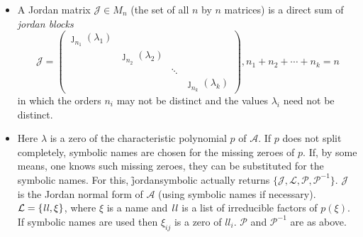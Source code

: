 \begin{description}
\begin{itemize}
\item A Jordan matrix $\mathcal{J} \in M_{n}$ (the set of all $n$ by $n$ 
      matrices) is a direct sum of \emph{jordan blocks}
%
      \begin{displaymath}
      \mathcal{J} = \begin{pmatrix} \jmath_{n_1}(\lambda_{1}) 
      \\  & \jmath_{n_2}(\lambda_{2}) \\ & & \ddots \\ & & & 
      \jmath_{n_k}(\lambda_{k}) \end{pmatrix} ,
      n_{1}+n_{2}+\cdots + n_{k} = n
      \end{displaymath}
%
      in which the orders $n_{i}$ may not be distinct and the 
      values ${\lambda_{i}}$ need not be distinct.

\item Here ${\lambda}$ is a zero of the characteristic polynomial 
      $p$ of $\mathcal{A}$. If $p$ does not split completely, 
      symbolic names are chosen for the missing zeroes of $p$.
      If, by some means, one knows such missing zeroes, they can be 
      substituted for the symbolic names. For this, 
      \f{jordansymbolic} actually returns $\{ \mathcal{J,L,P,P}^{-1} \}$.
      $\mathcal{J}$ is the Jordan normal form of $\mathcal{A}$ (using 
      symbolic names if necessary). $\mathcal{L} = \{ {\it ll}, \xi \}$, 
      where $\xi$ is a name and ${\it ll}$ is a list of irreducible 
      factors of $p(\xi)$. If symbolic names are used then 
      ${\xi}_{ij}$ is a zero of $ll_{i}$. $\mathcal{P}$ and 
      $\mathcal{P}^{-1}$ are as above.
\end{itemize}      


\end{description}
